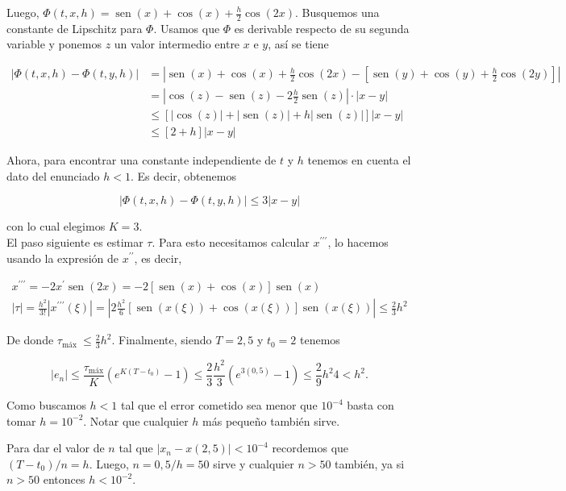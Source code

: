 \documentclass[10pt]{book}
\begin{document}
Luego, $\Phi(t, x, h)=\operatorname{sen}(x)+\cos (x)+\frac{h}{2} \cos (2 x)$. Busquemos una constante de Lipschitz para $\Phi$. Usamos que $\Phi$ es derivable respecto de su segunda variable y ponemos $z$ un valor intermedio entre $x$ e $y$, así se tiene

$$
\begin{aligned}
|\Phi(t, x, h)-\Phi(t, y, h)| & =\left|\operatorname{sen}(x)+\cos (x)+\frac{h}{2} \cos (2 x)-\left[\operatorname{sen}(y)+\cos (y)+\frac{h}{2} \cos (2 y)\right]\right| \\
& =\left|\cos (z)-\operatorname{sen}(z)-2 \frac{h}{2} \operatorname{sen}(z)\right| \cdot|x-y| \\
& \leq[|\cos (z)|+|\operatorname{sen}(z)|+h|\operatorname{sen}(z)|]|x-y| \\
& \leq[2+h]|x-y|
\end{aligned}
$$

Ahora, para encontrar una constante independiente de $t$ y $h$ tenemos en cuenta el dato del enunciado $h<1$. Es decir, obtenemos

$$
|\Phi(t, x, h)-\Phi(t, y, h)| \leq 3|x-y|
$$

con lo cual elegimos $K=3$.\\
El paso siguiente es estimar $\tau$. Para esto necesitamos calcular $x^{\prime \prime \prime}$, lo hacemos usando la expresión de $x^{\prime \prime}$, es decir,

$$
\begin{gathered}
x^{\prime \prime \prime}=-2 x^{\prime} \operatorname{sen}(2 x)=-2[\operatorname{sen}(x)+\cos (x)] \operatorname{sen}(x) \\
|\tau|=\frac{h^{2}}{3!}\left|x^{\prime \prime \prime}(\xi)\right|=\left|2 \frac{h^{2}}{6}[\operatorname{sen}(x(\xi))+\cos (x(\xi))] \operatorname{sen}(x(\xi))\right| \leq \frac{2}{3} h^{2}
\end{gathered}
$$

De donde $\tau_{\text {máx }} \leq \frac{2}{3} h^{2}$. Finalmente, siendo $T=2,5$ y $t_{0}=2$ tenemos

$$
\left|e_{n}\right| \leq \frac{\tau_{\operatorname{máx}}}{K}\left(e^{K\left(T-t_{0}\right)}-1\right) \leq \frac{2}{3} \frac{h^{2}}{3}\left(e^{3(0,5)}-1\right) \leq \frac{2}{9} h^{2} 4<h^{2} .
$$

Como buscamos $h<1$ tal que el error cometido sea menor que $10^{-4}$ basta con tomar $h=10^{-2}$. Notar que cualquier $h$ más pequeño también sirve.

Para dar el valor de $n$ tal que $\left|x_{n}-x(2,5)\right|<10^{-4}$ recordemos que $\left(T-t_{0}\right) / n=h$. Luego, $n=0,5 / h=50$ sirve y cualquier $n>50$ también, ya si $n>50$ entonces $h<10^{-2}$.
\end{document}
